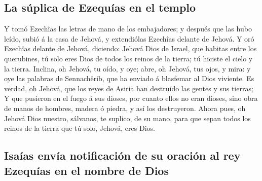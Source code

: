 \hypertarget{la-suxfaplica-de-ezequuxedas-en-el-templo}{%
\subsection{La súplica de Ezequías en el
templo}\label{la-suxfaplica-de-ezequuxedas-en-el-templo}}

 Y tomó Ezechîas las letras de mano de los embajadores; y
después que las hubo leído, subió á la casa de Jehová, y extendiólas
Ezechîas delante de Jehová.  Y oró Ezechîas delante de
Jehová, diciendo: Jehová Dios de Israel, que habitas entre los
querubines, tú solo eres Dios de todos los reinos de la tierra; tú
hiciste el cielo y la tierra.  Inclina, oh Jehová, tu oído,
y oye; abre, oh Jehová, tus ojos, y mira: y oye las palabras de
Sennachêrib, que ha enviado á blasfemar al Dios viviente. 
Es verdad, oh Jehová, que los reyes de Asiria han destruído las gentes y
sus tierras;  Y que pusieron en el fuego á sus dioses, por
cuanto ellos no eran dioses, sino obra de manos de hombres, madera ó
piedra, y así los destruyeron.  Ahora pues, oh Jehová Dios
nuestro, sálvanos, te suplico, de su mano, para que sepan todos los
reinos de la tierra que tú solo, Jehová, eres Dios.

\hypertarget{isauxedas-envuxeda-notificaciuxf3n-de-su-oraciuxf3n-al-rey-ezequuxedas-en-el-nombre-de-dios}{%
\subsection{Isaías envía notificación de su oración al rey Ezequías en
el nombre de
Dios}\label{isauxedas-envuxeda-notificaciuxf3n-de-su-oraciuxf3n-al-rey-ezequuxedas-en-el-nombre-de-dios}}

